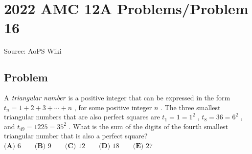 \documentclass[12pt]{article}
\begin{document}
\section*{{2022 AMC 12A Problems/Problem 16}}
Source: AoPS Wiki

\subsection*{Problem}
A $\emph{triangular number}$ is a positive integer that can be expressed in the form $t_n = 1+2+3+\cdots+n$ , for some positive integer $n$ . The three smallest triangular numbers that are also perfect squares are $t_1 = 1 = 1^2$ , $t_8 = 36 = 6^2$ , and $t_{49} = 1225 = 35^2$ . What is the sum of the digits of the fourth smallest triangular number that is also a perfect square? $\textbf{(A) } 6 \qquad \textbf{(B) } 9 \qquad \textbf{(C) } 12 \qquad \textbf{(D) } 18 \qquad \textbf{(E) } 27$
\end{document}
